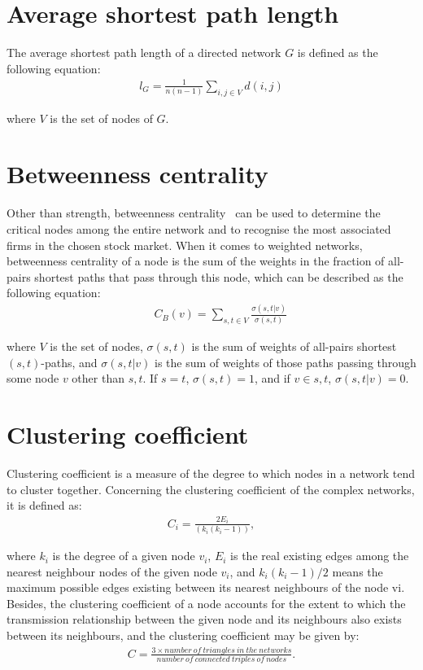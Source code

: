 \section{Average shortest path length}
The average shortest path length of a directed network $G$ is defined as the following equation:
\begin{eqnarray}
l_G=\frac{1}{n(n-1)}\sum_{i,j\in V}{d(i,j)}
\end{eqnarray}

where $V$ is the set of nodes of $G$.

\section{Betweenness centrality}

Other than strength, betweenness centrality~\cite{freeman1977set} can be used to determine the critical nodes among the entire network and to recognise the most associated firms in the chosen stock market. When it comes to weighted networks, betweenness centrality of a node is the sum of the weights in the fraction of all-pairs shortest paths that pass through this node, which can be described as the following equation:
\begin{eqnarray}
&&C_B(v)=\sum_{s,t \in V}\frac{\sigma(s,t|v)}{\sigma(s,t)}
\end{eqnarray}

where $V$ is the set of nodes, $\sigma(s,t)$ is the sum of weights of all-pairs shortest $(s,t)$-paths, and $\sigma(s,t|v)$ is the sum of weights of those paths passing through some node $v$ other than $s,t$. If $s=t$, $\sigma(s,t)=1$, and if $v\in s,t$, $\sigma(s,t|v)=0$.

\section{Clustering coefficient} %
Clustering coefficient is a measure of the degree to which nodes in a network tend to cluster together. Concerning the clustering coefficient of the complex networks, it is defined as:
\begin{eqnarray}
C_i=\frac{2E_i}{(k_i(k_i-1))},
\end{eqnarray}

where $k_i$ is the degree of a given node $v_i$, $E_i$ is the real existing edges among the nearest neighbour nodes of the given node $v_i$, and $k_i(k_i-1)/2$ means the maximum possible edges existing between its nearest neighbours of the node vi. Besides, the clustering coefficient of a node accounts for the extent to which the transmission relationship between the given node and its neighbours also exists between its neighbours, and the clustering coefficient may be given by:
\begin{eqnarray}
C=\frac{3\times number\ of\ triangles\ in\ the\ networks}{number\ of\ connected\ triples\ of\ nodes}.
\end{eqnarray}

